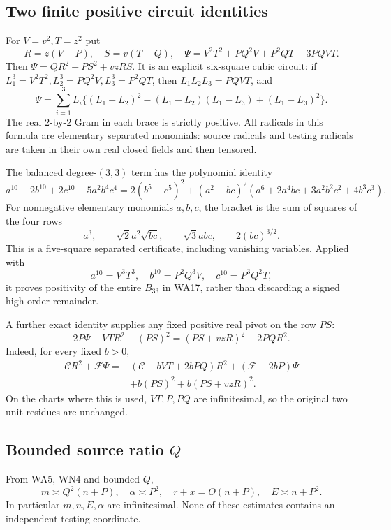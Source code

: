 \subsection{Two finite positive circuit identities}

For \(V=v^2,T=z^2\) put
\[
 R=z(V-P),\quad S=v(T-Q),\quad
 \Psi=V^2T^2+PQ^2V+P^2QT-3PQVT .
\]
Then \(\Psi=QR^2+PS^2+vzRS\). It is an explicit six-square
cubic circuit: if \(L_1^3=V^2T^2,L_2^3=PQ^2V,L_3^3=P^2QT\),
then \(L_1L_2L_3=PQVT\), and
\[
 \Psi=\sum_{i=1}^3 L_i
 \bigl\{(L_1-L_2)^2-(L_1-L_2)(L_1-L_3)+(L_1-L_3)^2\bigr\}.
 \tag{WN5}
\]
The real \(2\)-by-\(2\) Gram in each brace is strictly positive.
All radicals in this formula are elementary separated monomials:
source radicals and testing radicals are taken in their own real
closed fields and then tensored.

The balanced degree-\((3,3)\) term has the polynomial identity
\[
 a^{10}+2b^{10}+2c^{10}-5a^2b^4c^4
 =2(b^5-c^5)^2
 +(a^2-bc)^2(a^6+2a^4bc+3a^2b^2c^2+4b^3c^3).
 \tag{WN6}
\]
For nonnegative elementary monomials \(a,b,c\), the bracket is the
sum of squares of the four rows
\[
 a^3,\qquad \sqrt2a^2\sqrt{bc},\qquad
 \sqrt3abc,\qquad 2(bc)^{3/2}.
\]
This is a five-square separated certificate, including vanishing
variables. Applied with
\[
 a^{10}=V^3T^3,\quad b^{10}=P^2Q^3V,\quad c^{10}=P^3Q^2T,
\]
it proves positivity of the entire \(B_{33}\) in WA17, rather than
discarding a signed high-order remainder.

A further exact identity supplies any fixed positive real pivot
on the row \(PS\):
\[
 2P\Psi+VT R^2-(PS)^2=(PS+vzR)^2+2PQR^2.
 \tag{WN7}
\]
Indeed, for every fixed \(b>0\),
\[
\begin{split}
 \mathcal C R^2+\mathcal F\Psi={}&
 (\mathcal C-bVT+2bPQ)R^2+(\mathcal F-2bP)\Psi\\
 &+b(PS)^2+b(PS+vzR)^2.
\end{split}\tag{WN8}
\]
On the charts where this is used, \(VT,P,PQ\) are infinitesimal,
so the original two unit residues are unchanged.

\subsection{Bounded source ratio \(Q\)}

From WA5, WN4 and bounded \(Q\),
\[
 m\asymp Q^2(n+P),\quad \alpha\asymp P^2,\quad
 r+x=O(n+P),\quad E\asymp n+P^2.
 \tag{WN9}
\]
In particular \(m,n,E,\alpha\) are infinitesimal. None of these
estimates contains an independent testing coordinate.


